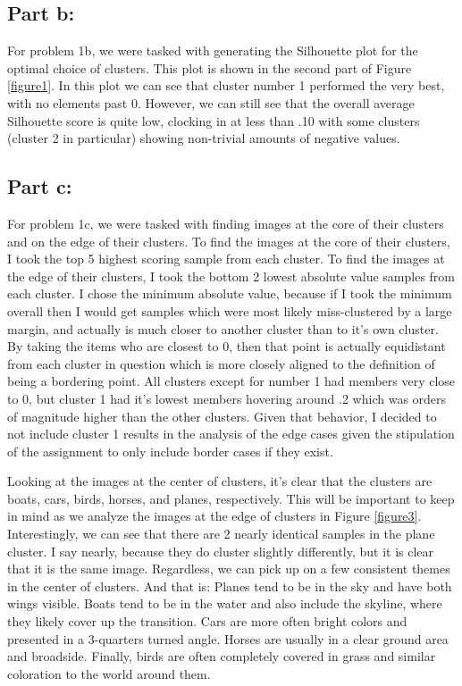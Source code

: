 \documentclass[12pt]{article}
\begin{document}
\subsection{Part b:}
For problem 1b, we were tasked with generating the Silhouette plot for the optimal choice of clusters. This plot is 
shown in the second part of Figure \ref{figure1}. In this plot we can see that cluster number 1 performed the very 
best, with no elements past 0. However, we can still see that the overall average Silhouette score is quite low, 
clocking in at less than .10 with  some clusters (cluster 2 in particular) showing non-trivial amounts of negative
values.

\subsection{Part c:}
For problem 1c, we were tasked with finding images at the core of their clusters and on the edge of their clusters.
To find the images at the core of their clusters, I took the top 5 highest scoring sample from each cluster. To find
the images at the edge of their clusters, I took the bottom 2 lowest absolute value samples from each cluster.
I chose the minimum absolute value, because if I took the minimum overall then I would get samples which were most 
likely miss-clustered by a large margin, and actually is much closer to another cluster than to it's own cluster. By taking the items who are 
closest to 0, then that point is actually equidistant from each cluster in question which is more closely aligned to 
the definition of being a bordering point. All clusters
except for number 1 had members very close to 0, but cluster 1 had it's lowest members hovering around .2 which was orders
of magnitude higher than the other clusters. Given that behavior, I decided to not include cluster 1 results in the analysis 
of the edge cases given the stipulation of the assignment to only include border cases if they exist.

Looking at the images at the center of clusters, it's clear that the clusters are boats, cars, birds, horses, and planes, 
respectively. This will be important to keep in mind as we analyze the images at the edge of clusters in Figure \ref{figure3}.
Interestingly, we can see that there are 2 nearly identical samples in the plane cluster. I say nearly, because they 
do cluster slightly differently, but it is clear that it is the same image. Regardless, we can pick up on a few consistent 
themes in the center of clusters. And that is: Planes tend to be in the sky and have both wings visible. Boats tend to be 
in the water and also include the skyline, where they likely cover up the transition. Cars are more often bright colors 
and presented in a 3-quarters turned angle. Horses are usually in a clear ground area and broadside. Finally, birds are 
often completely covered in grass and similar coloration to the world around them.
\end{document}
